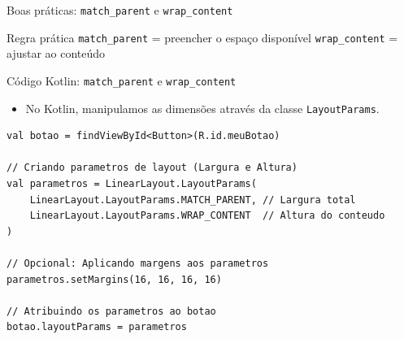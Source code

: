 \documentclass[aspectratio=169]{beamer}
\begin{document}
\begin{frame}{Boas práticas: \texttt{match\_parent} e \texttt{wrap\_content}}

\vspace{0.15cm}

\begin{block}{Regra prática}
\centering
\texttt{match\_parent} = preencher o espaço disponível
\qquad
\texttt{wrap\_content} = ajustar ao conteúdo
\end{block}

\end{frame}
\begin{frame}[fragile]{Código Kotlin: \texttt{match\_parent} e \texttt{wrap\_content}}
\begin{itemize}
    \item No Kotlin, manipulamos as dimensões através da classe \texttt{LayoutParams}.
\end{itemize}
\vspace{0.2cm}
\begin{lstlisting}[style=KotlinStyle]
val botao = findViewById<Button>(R.id.meuBotao)

// Criando parametros de layout (Largura e Altura)
val parametros = LinearLayout.LayoutParams(
    LinearLayout.LayoutParams.MATCH_PARENT, // Largura total
    LinearLayout.LayoutParams.WRAP_CONTENT  // Altura do conteudo
)

// Opcional: Aplicando margens aos parametros
parametros.setMargins(16, 16, 16, 16)

// Atribuindo os parametros ao botao
botao.layoutParams = parametros
\end{lstlisting}
\end{frame}
\end{document}
